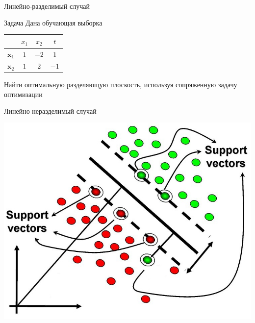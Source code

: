 \documentclass[10pt,a4paper]{beamer}
\begin{document}

\begin{frame}{Линейно-разделимый случай}

\begin{block}{Задача}
Дана обучающая выборка

\begin{center}
\begin{tabular}{l|cc|c}
 & $x_1$ & $x_2$ & $t$ \\
 \hline
$\mathbf{x}_1$ & $1$ & $-2$ & $1$ \\
$\mathbf{x}_2$ & $1$ & $2$ & $-1$ \\
\end{tabular}
\end{center}

Найти оптимальную разделяющую плоскость, используя сопряженную задачу оптимизации

\end{block}

\end{frame}


\begin{frame}{Линейно-неразделимый случай}

\begin{center}
\includegraphics[scale=0.45]{images/svm.jpg}
\end{center}

\end{frame}
\end{document}
